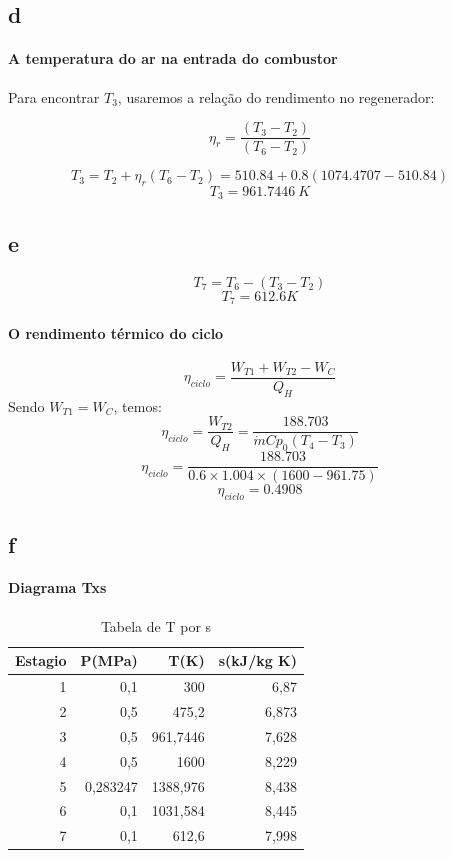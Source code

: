 \documentclass[a4paper, 12pt]{article}
\begin{document}
\subsection{d}
\paragraph*{A temperatura do ar na entrada do combustor}

Para encontrar $T_{3}$, usaremos a relação do rendimento no regenerador:

\[\eta _{r} = \frac{(T_{3}-T_{2})}{(T_{6}-T_{2})}\]

\[T_{3} =  T_{2} + \eta _{r}(T_{6}-T_{2}) = 510.84 + 0.8(1074.4707-510.84) \]
\[T_{3} = 961.7446 \ K\]

\subsection{e}

\[T_{7} = T_{6}- (T_{3}-T_{2})\]
\[T_{7} = 612.6 K\]

\paragraph*{O rendimento térmico do ciclo}

\[\eta _{ciclo} = \frac{W_{T1} + W_{T2} - W_{C}}{Q_{H}}\]
Sendo $W_{T1} = W_{C}$, temos:
\[\eta _{ciclo} = \frac{ W_{T2} }{Q_{H}} = \frac{188.703}{\dot{m}Cp_{0}(T_{4}-T_{3})}\]
\[\eta _{ciclo} = \frac{188.703}{0.6 \times 1.004 \times (1600 - 961.75)}\]
\[\eta _{ciclo} = 0.4908\]

\subsection{f}
\paragraph*{Diagrama Txs}

\begin{table}[htbp]
  \centering
  \caption{Tabela de T por s}
    \begin{tabular}{rrrr}
    \toprule
    Estagio & P(MPa) & T(K)  & s(kJ/kg K) \\
    \midrule
    1     & 0,1   & 300   & 6,87 \\
    2     & 0,5   & 475,2 & 6,873 \\
    3     & 0,5   & 961,7446 & 7,628 \\
    4     & 0,5   & 1600  & 8,229 \\
    5     & 0,283247 & 1388,976 & 8,438 \\
    6     & 0,1   & 1031,584 & 8,445 \\
    7     & 0,1   & 612,6 & 7,998 \\
    \bottomrule
    \end{tabular}%
  \label{tab:1}%
\end{table}%
\end{document}
